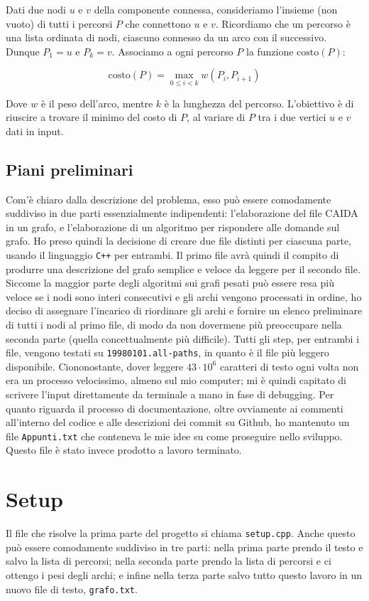 \documentclass[a4paper]{article}
\begin{document}
Dati due nodi $u$ e $v$ della componente connessa, consideriamo l'insieme (non vuoto) di tutti i percorsi $P$ che connettono $u$ e $v$. Ricordiamo che un percorso è una lista ordinata di nodi, ciascuno connesso da un arco con il successivo. Dunque $P_1 = u$ e $P_k = v$. Associamo a ogni percorso $P$ la funzione $\text{costo}(P)$:

$$
    \text{costo}(P) =  \max_{0\le i< k} w(P_i, P_{i+1})
$$

Dove $w$ è il peso dell'arco, mentre $k$ è la lunghezza del percorso.
L'obiettivo è di riuscire a trovare il minimo del costo di $P$, al variare di $P$ tra i due vertici $u$ e $v$ dati in input. 

\subsection{Piani preliminari}
Com'è chiaro dalla descrizione del problema, esso può essere comodamente suddiviso in due parti essenzialmente indipendenti: l'elaborazione del file CAIDA in un grafo, e l'elaborazione di un algoritmo per rispondere alle domande sul grafo. Ho preso quindi la decisione di creare due file distinti per ciascuna parte, usando il linguaggio \texttt{C++} per entrambi. Il primo file avrà quindi il compito di produrre una descrizione del grafo semplice e veloce da leggere per il secondo file. Siccome la maggior parte degli algoritmi sui grafi pesati può essere resa più veloce se i nodi sono interi consecutivi e gli archi vengono processati in ordine, ho deciso di assegnare l'incarico di riordinare gli archi e fornire un elenco preliminare di tutti i nodi al primo file, di modo da non dovermene più preoccupare nella seconda parte (quella concettualmente più difficile). Tutti gli step, per entrambi i file, vengono testati su \texttt{19980101.all-paths}, in quanto è il file più leggero disponibile. Ciononostante, dover leggere $43\cdot10^6$ caratteri di testo ogni volta non era un processo velocissimo, almeno sul mio computer; mi è quindi capitato di scrivere l'input direttamente da terminale a mano in fase di debugging. Per quanto riguarda il processo di documentazione, oltre ovviamente ai commenti all'interno del codice e alle descrizioni dei commit su Github, ho mantenuto un file \texttt{Appunti.txt} che conteneva le mie idee su come proseguire nello sviluppo. Questo file è stato invece prodotto a lavoro terminato.

\section{Setup}
Il file che risolve la prima parte del progetto si chiama \texttt{setup.cpp}. Anche questo può essere comodamente suddiviso in tre parti: nella prima parte prendo il testo e salvo la lista di percorsi; nella seconda parte prendo la lista di percorsi e ci ottengo i pesi degli archi; e infine nella terza parte salvo tutto questo lavoro in un nuovo file di testo, \texttt{grafo.txt}.
\end{document}
